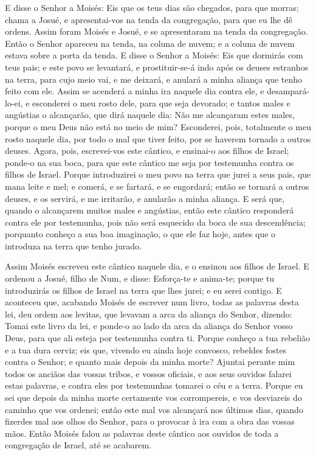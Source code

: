 E disse o Senhor a Moisés: Eis que os teus dias são chegados,
para que morras; chama a Josué, e apresentai-vos na tenda da
congregação, para que eu lhe dê ordens. Assim foram Moisés e Josué,
e se apresentaram na tenda da congregação. Então o Senhor
apareceu na tenda, na coluna de nuvem; e a coluna de nuvem estava
sobre a porta da tenda. E disse o Senhor a Moisés: Eis que
dormirás com teus pais; e este povo se levantará, e prostituir-se-á
indo após os deuses estranhos na terra, para cujo meio vai, e me
deixará, e anulará a minha aliança que tenho feito com ele.
Assim se acenderá a minha ira naquele dia contra ele, e
desampará-lo-ei, e esconderei o meu rosto dele, para que seja
devorado; e tantos males e angústias o alcançarão, que dirá naquele
dia: Não me alcançaram estes males, porque o meu Deus não está no
meio de mim? Esconderei, pois, totalmente o meu rosto naquele
dia, por todo o mal que tiver feito, por se haverem tornado a outros
deuses. Agora, pois, escrevei-vos este cântico, e ensinai-o
aos filhos de Israel; ponde-o na sua boca, para que este cântico me
seja por testemunha contra os filhos de Israel. Porque
introduzirei o meu povo na terra que jurei a seus pais, que mana
leite e mel; e comerá, e se fartará, e se engordará; então se
tornará a outros deuses, e os servirá, e me irritarão, e anularão a
minha aliança. E será que, quando o alcançarem muitos males e
angústias, então este cântico responderá contra ele por testemunha,
pois não será esquecido da boca de sua descendência; porquanto
conheço a sua boa imaginação, o que ele faz hoje, antes que o
introduza na terra que tenho jurado.

Assim Moisés escreveu este cântico naquele dia, e o ensinou aos
filhos de Israel. E ordenou a Josué, filho de Num, e disse:
Esforça-te e anima-te; porque tu introduzirás os filhos de Israel na
terra que lhes jurei; e eu serei contigo. E aconteceu que,
acabando Moisés de escrever num livro, todas as palavras desta lei,
deu ordem aos levitas, que levavam a arca da aliança do
Senhor, dizendo: Tomai este livro da lei, e ponde-o ao lado
da arca da aliança do Senhor vosso Deus, para que ali esteja por
testemunha contra ti. Porque conheço a tua rebelião e a tua
dura cerviz; eis que, vivendo eu ainda hoje convosco, rebeldes
fostes contra o Senhor; e quanto mais depois da minha morte?
Ajuntai perante mim todos os anciãos das vossas tribos, e
vossos oficiais, e aos seus ouvidos falarei estas palavras, e contra
eles por testemunhas tomarei o céu e a terra. Porque eu sei
que depois da minha morte certamente vos corrompereis, e vos
desviareis do caminho que vos ordenei; então este mal vos alcançará
nos últimos dias, quando fizerdes mal aos olhos do Senhor, para o
provocar à ira com a obra das vossas mãos. Então Moisés falou
as palavras deste cântico aos ouvidos de toda a congregação de
Israel, até se acabarem.

